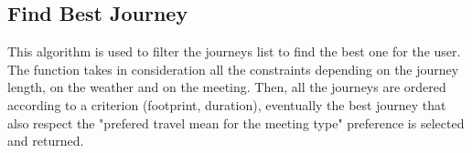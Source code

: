 

\subsection{Find Best Journey}
This algorithm is used to filter the journeys list to find the best one for the user.
The function takes in consideration all the constraints depending on the journey length, on the weather and on the meeting.
Then, all the journeys are ordered according to a criterion (footprint, duration), eventually the best journey that also respect the "prefered travel mean for the meeting type" preference is selected and returned.


